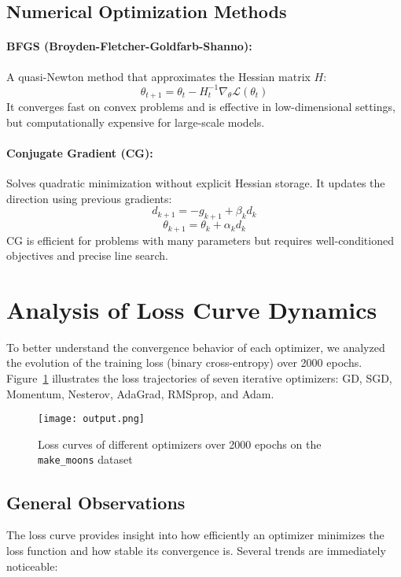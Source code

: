 \documentclass[12pt]{article}
\begin{document}
\subsection{Numerical Optimization Methods}

\paragraph{BFGS (Broyden-Fletcher-Goldfarb-Shanno):}  
A quasi-Newton method that approximates the Hessian matrix $H$:
\[
\theta_{t+1} = \theta_t - H_t^{-1} \nabla_{\theta} \mathcal{L}(\theta_t)
\]
It converges fast on convex problems and is effective in low-dimensional settings, but computationally expensive for large-scale models.

\paragraph{Conjugate Gradient (CG):}  
Solves quadratic minimization without explicit Hessian storage. It updates the direction using previous gradients:
\[
d_{k+1} = -g_{k+1} + \beta_k d_k
\]
\[
\theta_{k+1} = \theta_k + \alpha_k d_k
\]
CG is efficient for problems with many parameters but requires well-conditioned objectives and precise line search.

\section{Analysis of Loss Curve Dynamics}

To better understand the convergence behavior of each optimizer, we analyzed the evolution of the training loss (binary cross-entropy) over 2000 epochs. Figure~\ref{fig:loss-curves} illustrates the loss trajectories of seven iterative optimizers: GD, SGD, Momentum, Nesterov, AdaGrad, RMSprop, and Adam.

\begin{figure}[H]
    \centering
    \texttt{[image: output.png]}
    \caption{Loss curves of different optimizers over 2000 epochs on the \texttt{make\_moons} dataset}
    \label{fig:loss-curves}
\end{figure}

\subsection{General Observations}

The loss curve provides insight into how efficiently an optimizer minimizes the loss function and how stable its convergence is. Several trends are immediately noticeable:
\end{document}
